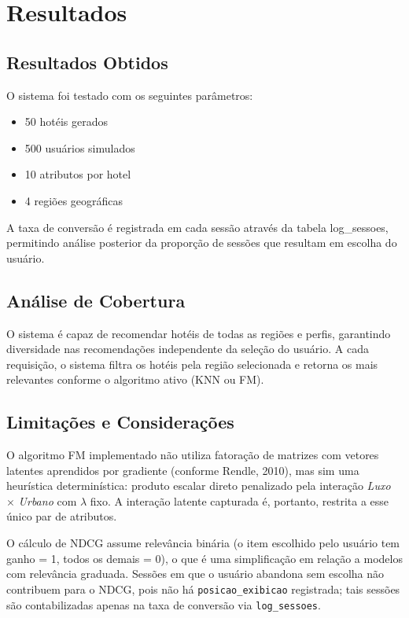 \documentclass[10pt,twocolumn,letterpaper]{article}
\begin{document}
\section{Resultados}

\subsection{Resultados Obtidos}

O sistema foi testado com os seguintes parâmetros:
\begin{itemize}
    \item 50 hotéis gerados
    \item 500 usuários simulados
    \item 10 atributos por hotel
    \item 4 regiões geográficas
\end{itemize}

A taxa de conversão é registrada em cada sessão através da tabela 
log\_sessoes, permitindo análise posterior da proporção de sessões 
que resultam em escolha do usuário.

\subsection{Análise de Cobertura}

O sistema é capaz de recomendar hotéis de todas as regiões e perfis,
garantindo diversidade nas recomendações independente da seleção do usuário.
A cada requisição, o sistema filtra os hotéis pela região selecionada e 
retorna os mais relevantes conforme o algoritmo ativo (KNN ou FM).

\subsection{Limitações e Considerações}

O algoritmo FM implementado não utiliza fatoração de matrizes com vetores latentes aprendidos por gradiente (conforme Rendle, 2010), mas sim uma heurística determinística: produto escalar direto penalizado pela interação \textit{Luxo} $\times$ \textit{Urbano} com $\lambda$ fixo. A interação latente capturada é, portanto, restrita a esse único par de atributos.

O cálculo de NDCG assume relevância binária (o item escolhido pelo usuário tem ganho = 1, todos os demais = 0), o que é uma simplificação em relação a modelos com relevância graduada. Sessões em que o usuário abandona sem escolha não contribuem para o NDCG, pois não há \texttt{posicao\_exibicao} registrada; tais sessões são contabilizadas apenas na taxa de conversão via \texttt{log\_sessoes}.
\end{document}
